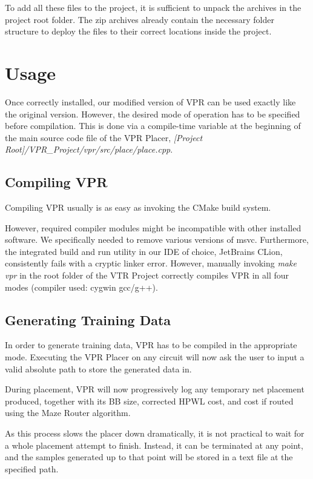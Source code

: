 To add all these files to the project, it is sufficient to unpack the archives in the project root folder. The zip archives already contain the necessary folder structure to deploy the files to their correct locations inside the project.

\section{Usage}

Once correctly installed, our modified version of \gls{VPR} can be used exactly like the original version. However, the desired mode of operation has to be specified before compilation. This is done via a compile-time variable at the beginning of the main source code file of the \gls{VPR} Placer, \textit{[Project Root]/VPR\_Project/vpr/src/place/place.cpp}.

\subsection{Compiling \gls{VPR}}

Compiling \gls{VPR} usually is as easy as invoking the CMake build system. 

However, required compiler modules might be incompatible with other installed software. We specifically needed to remove various versions of \gls{msvc}. Furthermore, the integrated build and run utility in our IDE of choice, JetBrains CLion, consistently fails with a cryptic linker error. However, manually invoking \textit{make vpr} in the root folder of the \gls{VTR} Project correctly compiles \gls{VPR} in all four modes (compiler used: cygwin gcc/g++).

\subsection{Generating Training Data}

In order to generate training data, \gls{VPR} has to be compiled in the appropriate mode. Executing the \gls{VPR} Placer on any circuit will now ask the user to input a valid absolute path to store the generated data in.

During placement, \gls{VPR} will now progressively log any temporary net placement produced, together with its \gls{BB} size, corrected \gls{HPWL} cost, and cost if routed using the Maze Router algorithm.

As this process slows the placer down dramatically, it is not practical to wait for a whole placement attempt to finish. Instead, it can be terminated at any point, and the samples generated up to that point will be stored in a text file at the specified path.

